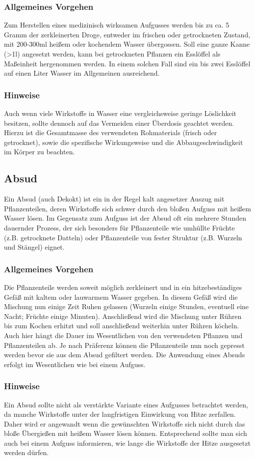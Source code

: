 \subsubsection{Allgemeines Vorgehen}
Zum Herstellen eines medizinisch wirksamen Aufgusses werden bis zu ca. 5 Gramm der zerkleinerten Droge, entweder im frischen oder getrockneten Zustand, mit 200-300ml heißem oder kochendem Wasser übergossen. Soll eine ganze Kanne (>1l) angesetzt werden, kann bei getrockneten Pflanzen ein Esslöffel als Maßeinheit hergenommen werden. In einem solchen Fall sind ein bis zwei Esslöffel auf einen Liter Wasser im Allgemeinen ausreichend.
\subsubsection{Hinweise}
Auch wenn viele Wirkstoffe in Wasser eine vergleichsweise geringe Löslichkeit besitzen, sollte dennoch auf das Vermeiden einer Überdosis geachtet werden. Hierzu ist die Gesamtmasse des verwendeten Rohmaterials (frisch oder getrocknet), sowie die spezifische Wirkungsweise und die Abbaugeschwindigkeit im Körper zu beachten.

\subsection{Absud}
Ein Absud (auch Dekokt) ist ein in der Regel kalt angesetzer Auszug mit Pflanzenteilen, deren Wirkstoffe sich schwer durch den bloßen Aufguss mit heißem Wasser lösen. Im Gegensatz zum Aufguss ist der Absud oft ein mehrere Stunden dauernder Prozess, der sich besonders für Pflanzenteile wie umhüllte Früchte (z.B. getrocknete Datteln) oder Pflanzenteile von fester Struktur (z.B. Wurzeln und Stängel) eignet.
\subsubsection{Allgemeines Vorgehen}
Die Pflanzenteile werden soweit möglich zerkleinert und in ein hitzebeständiges Gefäß mit kaltem oder lauwarmem Wasser gegeben. In diesem Gefäß wird die Mischung nun einige Zeit Ruhen gelassen (Wurzeln einige Stunden, eventuell eine Nacht; Früchte einige Minuten). Anschließend wird die Mischung unter Rühren bis zum Kochen erhitzt und soll anschließend weiterhin unter Rühren köcheln. Auch hier hängt die Dauer im Wesentlichen von den verwendeten Pflanzen und Pflanzenteilen ab. Je nach Präferenz können die Pflanzenteile nun noch gepresst werden bevor sie aus dem Absud gefiltert werden.
Die Anwendung eines Absuds erfolgt im Wesentlichen wie bei einem Aufguss.
\subsubsection{Hinweise}
Ein Absud sollte nicht als verstärkte Variante eines Aufgusses betrachtet werden, da manche Wirkstoffe unter der langfristigen Einwirkung von Hitze zerfallen. Daher wird er angewandt wenn die gewünschten Wirkstoffe sich nicht durch das bloße Übergießen mit heißem Wasser lösen können. Entsprechend sollte man sich auch bei einem Aufguss informieren, wie lange die Wirkstoffe der Hitze ausgesetzt werden dürfen.

																	